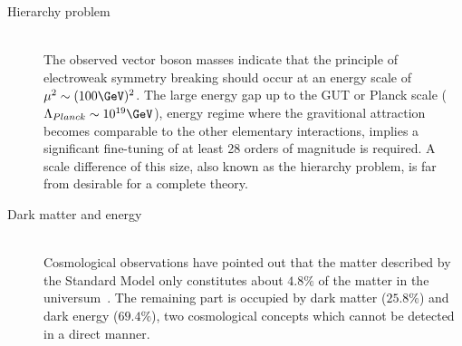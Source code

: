 \begin{myindentpar}
\begin{description}
    \item[Hierarchy problem] \hfill \\
    The observed vector boson masses indicate that the principle of electroweak symmetry breaking should occur at an energy scale of $\mu^{2} \sim (100 \GeV)^{2}$.
    The large energy gap up to the GUT or Planck scale ($\Lambda_{Planck} \sim 10^{19} \GeV$), energy regime where the gravitional attraction becomes comparable to the other elementary interactions, implies a significant fine-tuning of at least 28 orders of magnitude is required. 
    A scale difference of this size, also known as the hierarchy problem, is far from desirable for a complete theory.
    
    \item[Dark matter and energy] \hfill \\
    Cosmological observations have pointed out that the matter described by the Standard Model only constitutes about $4.8 \%$ of the matter in the universum~\cite{PlanckResults}. The remaining part is occupied by dark matter ($25.8 \%$) and dark energy ($69.4 \%$), two cosmological concepts which cannot be detected in a direct manner.
    
    
   \end{description}
\end{myindentpar}
